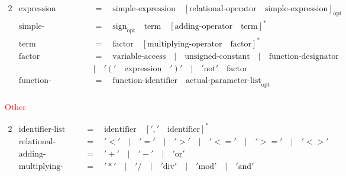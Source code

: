 \documentclass{article}
\begin{document}
\begin{alignat*}{2}
&\text{expression}\quad&&=\quad\text{simple-expression}\quad{[\text{relational-operator}\quad\text{simple-expression}]}_\text{opt}\\
&\text{simple-expression}\quad&&=\quad\text{sign}_\text{opt}\quad\text{term}\quad{[\text{adding-operator}\quad\text{term}]}^*\\
&\text{term}\quad&&=\quad\text{factor}\quad{[\text{multiplying-operator}\quad\text{factor}]}^*\\
&\text{factor}\quad&&=\quad\text{variable-access}\quad|\quad\text{unsigned-constant}\quad|\quad\text{function-designator}\\
&&&|\quad'('\quad\text{expression}\quad')'\quad|\quad'\text{not}'\quad\text{factor}\\
&\text{function-designator}\quad&&=\quad\text{function-identifier}\quad\text{actual-parameter-list}_\text{opt}\\
\end{alignat*}

\textcolor{red}{Other}

\begin{alignat*}{2}
&\text{identifier-list}\quad&&=\quad\text{identifier}\quad{[','\quad\text{identifier}]}^*\\
&\text{relational-operator}\quad&&=\quad'<'\quad|\quad'='\quad|\quad'>'\quad|\quad'<='\quad|\quad'>='\quad|\quad'<>'\\
&\text{adding-operator}\quad&&=\quad'+'\quad|\quad'-'\quad|\quad'\text{or}'\\
&\text{multiplying-operator}\quad&&=\quad'*'\quad|\quad'/\quad|\quad'\text{div}'\quad|\quad'\text{mod}'\quad|\quad'\text{and}'\\
\end{alignat*}
\end{document}
